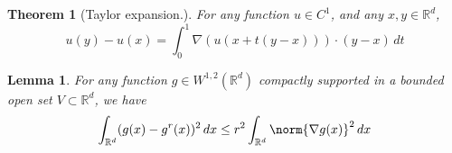 \documentclass{article}
\newcommand{\Reals}{\mathbb{R}}
\newcommand{\1}{\mathbf{1}}
\newcommand{\Rd}{\Reals^d}
\theoremstyle{alden}
\theoremstyle{aldenthm}
\newtheorem{theorem}{Theorem}
\newtheorem{lemma}{Lemma}
\theoremstyle{definition}
\theoremstyle{remark}
\begin{document}
\begin{theorem}[Taylor expansion.]
	\label{thm:taylor_expansion}
	For any function $u \in C^1$, and any $x,y \in \Rd$, 
	\begin{equation*}
	u(y) - u(x) = \int_{0}^{1} \nabla(u(x + t(y - x))) \cdot (y - x) \,dt
	\end{equation*}
\end{theorem}

\begin{lemma}
	\label{lem:poincare_mollify}
	For any function $g \in W^{1,2}(\Rd)$ compactly supported in a bounded open set $V \subset \Rd$, we have
	\begin{equation}
	\label{eqn:poincare_mollify}
	\int_{\Rd} (g(x) - g^r(x))^2 \,dx \leq r^2 \int_{\Rd} \norm{\nabla g(x)}^2 \,dx
	\end{equation}
\end{lemma}
\end{document}
